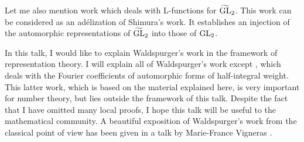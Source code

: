 Let me also mention work \cite{gps81shimura,gps83metaplectic} which deals with L-functions for $\widetilde{\mathrm{GL}}_2$.
This work can be considered as an ad\'elization of Shimura's
work.
It establishes an injection of the automorphic representations of $\widetilde{\mathrm{GL}}_2$ into those of $\mathrm{GL}_2$.

In this talk, I would like to explain Waldspurger's work in the framework of representation theory.
I will explain all of Waldspurger's work except \cite{waldspurger81demientier}, which deals with the Fourier coefficients of automorphic forms of half-integral weight.
This latter work, which is based on the material explained here, is very important for number theory, but lies outside the framework of this talk.
Despite the fact that I have omitted many local proofs, I hope this talk will be useful to the mathematical community. 
A beautiful exposition of Waldspurger's work from the classical point of view has been given in a talk by Marie-France Vigneras \cite{vigneras79center}.